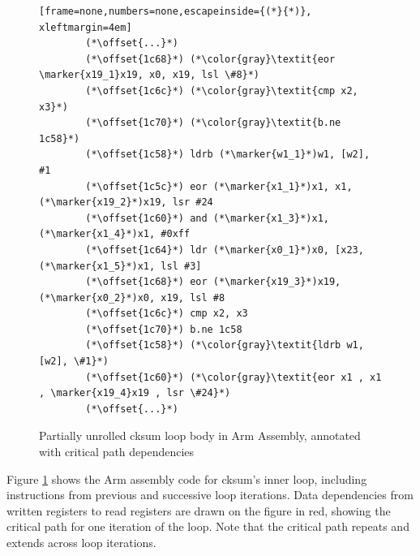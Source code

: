 \begin{figure}[H]
  \centering
    \begin{minipage}{0.6\textwidth}
      \begin{lstlisting}[frame=none,numbers=none,escapeinside={(*}{*)}, xleftmargin=4em]
        (*\offset{...}*)
        (*\offset{1c68}*) (*\color{gray}\textit{eor \marker{x19_1}x19, x0, x19, lsl \#8}*)
        (*\offset{1c6c}*) (*\color{gray}\textit{cmp x2, x3}*)
        (*\offset{1c70}*) (*\color{gray}\textit{b.ne 1c58}*)
        (*\offset{1c58}*) ldrb (*\marker{w1_1}*)w1, [w2], #1
        (*\offset{1c5c}*) eor (*\marker{x1_1}*)x1, x1, (*\marker{x19_2}*)x19, lsr #24
        (*\offset{1c60}*) and (*\marker{x1_3}*)x1, (*\marker{x1_4}*)x1, #0xff
        (*\offset{1c64}*) ldr (*\marker{x0_1}*)x0, [x23, (*\marker{x1_5}*)x1, lsl #3]
        (*\offset{1c68}*) eor (*\marker{x19_3}*)x19, (*\marker{x0_2}*)x0, x19, lsl #8
        (*\offset{1c6c}*) cmp x2, x3
        (*\offset{1c70}*) b.ne 1c58
        (*\offset{1c58}*) (*\color{gray}\textit{ldrb w1, [w2], \#1}*)
        (*\offset{1c60}*) (*\color{gray}\textit{eor x1 , x1 , \marker{x19_4}x19 , lsr \#24}*)
        (*\offset{...}*)
      \end{lstlisting}
    \end{minipage}
  \caption{Partially unrolled cksum loop body in Arm Assembly, annotated with critical path dependencies}
  \label{fig:cksum-deps}
\end{figure}


Figure \ref{fig:cksum-deps}
shows the Arm assembly code for cksum's inner loop, including instructions from previous and successive loop iterations.
Data dependencies from written registers to read registers are drawn on the figure in red, showing the critical path 
for one iteration of the loop. Note that the critical path repeats and extends across loop iterations.

